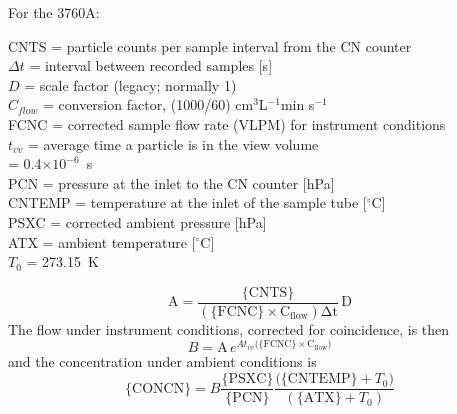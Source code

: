 \documentclass[
]{book}
\begin{document}
For the 3760A:

CNTS = particle counts per sample interval from the CN counter\\
\(\Delta t\) = interval
between recorded samples {[}s{]}\\
\(D\) = scale factor (legacy; normally 1)\\
\(C_{flow}\) = conversion
factor, (1000/60) cm\(^{3}\)L\(^{-1}\)min s\(^{-1}\)\\
FCNC = corrected sample flow rate (VLPM) for instrument conditions\\
\(t_{vv}\) = average time a particle is in the view volume\\
\hspace*{0.333em}\hspace*{0.333em}\hspace*{0.333em}\hspace*{0.333em}\hspace*{0.333em}\hspace*{0.333em}\hspace*{0.333em}= 0.4\(\times10^{-6}\)~s\\
PCN = pressure at the inlet to the CN counter {[}hPa{]}\\
CNTEMP = temperature at the inlet of the sample tube {[}\(^{\circ}\)C{]}\\
PSXC = corrected ambient pressure {[}hPa{]}\\
ATX = ambient temperature {[}\(^{\circ}\)C{]}\\
\(T_{0}\) = 273.15~K

\begin{equation}
\mathrm{A=\frac{\{CNTS\}}{\mathrm{(\{FCNC\}\times C_{flow})}\Delta t}\,D}
\label{eq:CONCNbox1}
\end{equation}
The flow under instrument conditions, corrected for coincidence, is
then\\
\begin{equation}
B\mathrm{=A}\,e^{At_{vv}(\mathrm{\{FCNC\}\times C_{flow})}}
\label{eq:CONCNbox2}
\end{equation}
and the concentration under ambient conditions is\\
\begin{equation}
\mathrm{\{CONCN\}}=B\frac{\mathrm{\{PSXC\}}}{\mathrm{\{PCN\}}}\frac{\mathrm{(\{CNTEMP\}}+T_{0})}{(\mathrm{\{ATX\}}+T_{0})}
\label{eq:CONCNbox3}
\end{equation}
\end{document}
